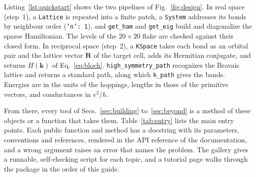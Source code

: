 \documentclass[submission, Phys]{SciPost}
\newcommand{\code}[1]{\texttt{#1}}
\begin{document}


Listing~\ref{lst:quickstart} shows the two pipelines of
Fig.~\ref{fig:design}. In real space (step~1), a \code{Lattice} is
repeated into a finite patch, a \code{System} addresses its bonds by
neighbour order (\code{'n': 1}), and \code{get\_ham} and \code{get\_eig}
build and diagonalize the sparse Hamiltonian. The levels of the
$20\times20$ flake are checked against their closed form. In reciprocal
space (step~2), a \code{KSpace} takes each bond as an orbital pair and the
lattice vector $\mathbf{R}$ of the target cell, adds its Hermitian
conjugate, and returns $H(\mathbf{k})$ of Eq.~\eqref{eq:bloch}.
\code{high\_symmetry\_path} recognizes the Bravais lattice and returns a
standard path, along which \code{k\_path} gives the bands. Energies are in
the units of the hoppings, lengths in those of the primitive vectors, and
conductances in $e^2/h$.

From there, every tool of Secs.~\ref{sec:building} to~\ref{sec:beyond} is
a method of these objects or a function that takes them.
Table~\ref{tab:entry} lists the main entry points. Each public function
and method has a docstring with its parameters, conventions and
references, rendered in the API reference of the documentation, and a
wrong argument raises an error that names the problem. The gallery
gives a runnable, self-checking script for each topic, and a tutorial
page walks through the package in the order of this guide.
\end{document}

